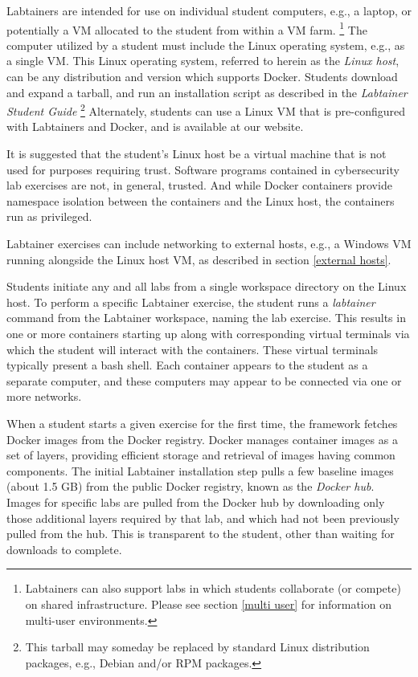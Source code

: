 \documentclass[12pt]{article}
\begin{document}
Labtainers are intended for use on individual student computers, e.g., a laptop,
or potentially a VM allocated to the student from within a VM farm. \footnote{Labtainers
can also support labs in which students collaborate (or compete) on shared infrastructure.
Please see section \ref{multi user} for information on multi-user environments.}
The computer utilized by a student must include the Linux operating system, e.g.,
as a single VM.  This Linux operating system, referred to herein
as the \textit{Linux host}, can be any distribution and version
which supports Docker.  Students download and expand a tarball, and run
an installation script as described in the \textit{Labtainer Student Guide}
\footnote{This tarball may someday be replaced by standard Linux distribution packages,
e.g., Debian and/or RPM packages.} Alternately, students can use a Linux VM
that is pre-configured with Labtainers and Docker, and is available at our website.

It is suggested that the student's Linux host be a virtual machine that is
not used for purposes requiring trust.  Software programs contained in cybersecurity lab
exercises are not, in general, trusted.  And while Docker containers provide namespace
isolation between the containers and the Linux host, the containers run as privileged.

Labtainer exercises can include networking to external hosts, e.g., a Windows VM
running alongside the Linux host VM, as described in section \ref{external hosts}.

Students initiate any and all labs from a
single workspace directory on the Linux host.
To perform a specific Labtainer exercise, the student runs a \textit{labtainer} command from
the Labtainer workspace, naming the lab exercise.  This results in one or more
containers starting up along with corresponding virtual terminals via which the 
student will interact with the containers.  These virtual terminals typically
present a bash shell.  Each container appears to the student as a separate
computer, and these computers may appear to be connected via one or more networks.  

When a student starts a given exercise for the first time, the framework fetches
Docker images from the Docker registry.  Docker manages container images as a set of
layers, providing efficient storage and retrieval of images having common components.
The initial Labtainer installation step pulls a few baseline images (about 1.5 GB) from 
the public
Docker registry, known as the \textit{Docker hub}.  Images for specific labs are pulled
from the Docker hub by downloading only those additional layers required by that lab, and
which had not been previously pulled from the hub.  This is transparent to
the student, other than waiting for downloads to complete.
\end{document}
